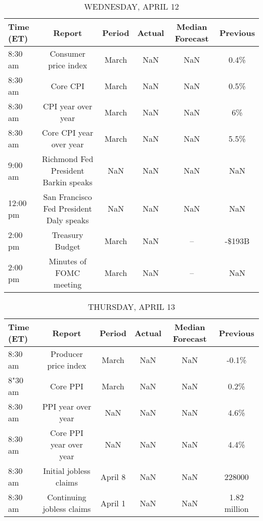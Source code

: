 \documentclass{article}%
\begin{document}
\begin{table}[htbp]%
\caption{WEDNESDAY, APRIL 12}%
\centering%
\begin{adjustbox}{width=1\textwidth}%
\begin{tabular}{lccccc}
\toprule
Time (ET) &                                  Report & Period & Actual & Median Forecast & Previous \\
\midrule
  8:30 am &                    Consumer price index &  March &    NaN &             NaN &     0.4\% \\
  8:30 am &                                Core CPI &  March &    NaN &             NaN &     0.5\% \\
  8:30 am &                      CPI year over year &  March &    NaN &             NaN &       6\% \\
  8:30 am &                 Core CPI year over year &  March &    NaN &             NaN &     5.5\% \\
  9:00 am &    Richmond Fed President Barkin speaks &    NaN &    NaN &             NaN &      NaN \\
 12:00 pm & San Francisco Fed President Daly speaks &    NaN &    NaN &             NaN &      NaN \\
  2:00 pm &                         Treasury Budget &  March &    NaN &              -- &   -\$193B \\
  2:00 pm &                 Minutes of FOMC meeting &  March &    NaN &              -- &      NaN \\
\bottomrule
\end{tabular}
%
\end{adjustbox}%
\end{table}

%


\begin{table}[htbp]%
\caption{THURSDAY, APRIL 13}%
\centering%
\begin{adjustbox}{width=1\textwidth}%
\begin{tabular}{lccccc}
\toprule
Time (ET) &                    Report &  Period & Actual & Median Forecast &     Previous \\
\midrule
  8:30 am &      Producer price index &   March &    NaN &             NaN &        -0.1\% \\
  8"30 am &                  Core PPI &   March &    NaN &             NaN &         0.2\% \\
  8:30 am &        PPI year over year &     NaN &    NaN &             NaN &         4.6\% \\
  8:30 am &   Core PPI year over year &     NaN &    NaN &             NaN &         4.4\% \\
  8:30 am &    Initial jobless claims & April 8 &    NaN &             NaN &       228000 \\
  8:30 am & Continuing jobless claims & April 1 &    NaN &             NaN & 1.82 million \\
\bottomrule
\end{tabular}
%
\end{adjustbox}%
\end{table}
\end{document}
